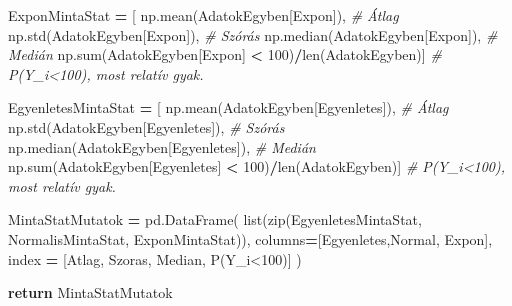 \documentclass[
]{book}
\newenvironment{Shaded}{\begin{snugshade}}{\end{snugshade}}
\newcommand{\BuiltInTok}[1]{#1}
\newcommand{\CommentTok}[1]{\textcolor[rgb]{0.56,0.35,0.01}{\textit{#1}}}
\newcommand{\ControlFlowTok}[1]{\textcolor[rgb]{0.13,0.29,0.53}{\textbf{#1}}}
\newcommand{\DecValTok}[1]{\textcolor[rgb]{0.00,0.00,0.81}{#1}}
\newcommand{\NormalTok}[1]{#1}
\newcommand{\OperatorTok}[1]{\textcolor[rgb]{0.81,0.36,0.00}{\textbf{#1}}}
\newcommand{\StringTok}[1]{\textcolor[rgb]{0.31,0.60,0.02}{#1}}
\begin{document}
\begin{Shaded}
\begin{Highlighting}[]
\NormalTok{    ExponMintaStat }\OperatorTok{=}\NormalTok{ [}
\NormalTok{      np.mean(AdatokEgyben[}\StringTok{\textquotesingle{}Expon\textquotesingle{}}\NormalTok{]), }\CommentTok{\# Átlag}
\NormalTok{      np.std(AdatokEgyben[}\StringTok{\textquotesingle{}Expon\textquotesingle{}}\NormalTok{]), }\CommentTok{\# Szórás}
\NormalTok{      np.median(AdatokEgyben[}\StringTok{\textquotesingle{}Expon\textquotesingle{}}\NormalTok{]), }\CommentTok{\# Medián}
\NormalTok{      np.}\BuiltInTok{sum}\NormalTok{(AdatokEgyben[}\StringTok{\textquotesingle{}Expon\textquotesingle{}}\NormalTok{] }\OperatorTok{\textless{}} \DecValTok{100}\NormalTok{)}\OperatorTok{/}\BuiltInTok{len}\NormalTok{(AdatokEgyben)] }\CommentTok{\# P(Y\_i\textless{}100), most relatív gyak.}

\NormalTok{    EgyenletesMintaStat }\OperatorTok{=}\NormalTok{ [}
\NormalTok{      np.mean(AdatokEgyben[}\StringTok{\textquotesingle{}Egyenletes\textquotesingle{}}\NormalTok{]), }\CommentTok{\# Átlag}
\NormalTok{      np.std(AdatokEgyben[}\StringTok{\textquotesingle{}Egyenletes\textquotesingle{}}\NormalTok{]), }\CommentTok{\# Szórás}
\NormalTok{      np.median(AdatokEgyben[}\StringTok{\textquotesingle{}Egyenletes\textquotesingle{}}\NormalTok{]), }\CommentTok{\# Medián}
\NormalTok{      np.}\BuiltInTok{sum}\NormalTok{(AdatokEgyben[}\StringTok{\textquotesingle{}Egyenletes\textquotesingle{}}\NormalTok{] }\OperatorTok{\textless{}} \DecValTok{100}\NormalTok{)}\OperatorTok{/}\BuiltInTok{len}\NormalTok{(AdatokEgyben)] }\CommentTok{\# P(Y\_i\textless{}100), most relatív gyak.}

\NormalTok{    MintaStatMutatok }\OperatorTok{=}\NormalTok{ pd.DataFrame(}
      \BuiltInTok{list}\NormalTok{(}\BuiltInTok{zip}\NormalTok{(EgyenletesMintaStat, NormalisMintaStat, ExponMintaStat)),}
\NormalTok{      columns}\OperatorTok{=}\NormalTok{[}\StringTok{\textquotesingle{}Egyenletes\textquotesingle{}}\NormalTok{,}\StringTok{\textquotesingle{}Normal\textquotesingle{}}\NormalTok{, }\StringTok{\textquotesingle{}Expon\textquotesingle{}}\NormalTok{],}
\NormalTok{      index }\OperatorTok{=}\NormalTok{ [}\StringTok{\textquotesingle{}Atlag\textquotesingle{}}\NormalTok{, }\StringTok{\textquotesingle{}Szoras\textquotesingle{}}\NormalTok{, }\StringTok{\textquotesingle{}Median\textquotesingle{}}\NormalTok{, }\StringTok{\textquotesingle{}P(Y\_i\textless{}100)\textquotesingle{}}\NormalTok{]}
\NormalTok{    )}
    
    \ControlFlowTok{return}\NormalTok{ MintaStatMutatok}
\end{Highlighting}
\end{Shaded}
\end{document}
